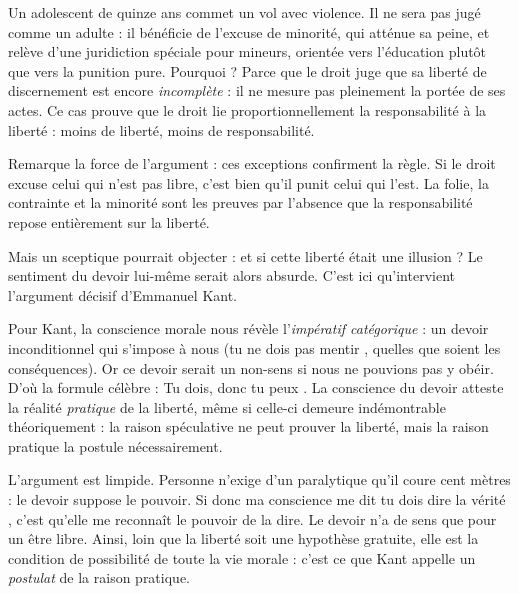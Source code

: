 \documentclass[11pt]{article}
\newcounter{popsec}
\newcounter{popsub}
\newcommand{\courssub}[1]{%
  \stepcounter{popsub}%
  \par\vspace{9pt}\noindent{\popxbold\fontsize{11.5}{13}\selectfont\color{popink}{\color{poporange}\thepopsec.\thepopsub}\hspace{6pt}#1}\par\nopagebreak\vspace{4pt}
}
\begin{document}
\begin{exemplebox}
Un adolescent de quinze ans commet un vol avec violence. Il ne sera pas jugé comme un adulte : il bénéficie de l'excuse de minorité, qui atténue sa peine, et relève d'une juridiction spéciale pour mineurs, orientée vers l'éducation plutôt que vers la punition pure. Pourquoi ? Parce que le droit juge que sa liberté de discernement est encore \emph{incomplète} : il ne mesure pas pleinement la portée de ses actes. Ce cas prouve que le droit lie proportionnellement la responsabilité à la liberté : moins de liberté, moins de responsabilité.
\end{exemplebox}

Remarque la force de l'argument : ces exceptions confirment la règle. Si le droit excuse celui qui n'est pas libre, c'est bien qu'il punit celui qui l'est. La folie, la contrainte et la minorité sont les preuves par l'absence que la responsabilité repose entièrement sur la liberté.

\courssub{Kant : « Tu dois, donc tu peux »}

Mais un sceptique pourrait objecter : et si cette liberté était une illusion ? Le sentiment du devoir lui-même serait alors absurde. C'est ici qu'intervient l'argument décisif d'Emmanuel Kant.

\begin{propriete}
Pour Kant, la conscience morale nous révèle l'\emph{impératif catégorique} : un devoir inconditionnel qui s'impose à nous (\guillemotleft tu ne dois pas mentir \guillemotright, quelles que soient les conséquences). Or ce devoir serait un non-sens si nous ne pouvions pas y obéir. D'où la formule célèbre : \guillemotleft Tu dois, donc tu peux \guillemotright. La conscience du devoir atteste la réalité \emph{pratique} de la liberté, même si celle-ci demeure indémontrable théoriquement : la raison spéculative ne peut prouver la liberté, mais la raison pratique la postule nécessairement.
\end{propriete}

L'argument est limpide. Personne n'exige d'un paralytique qu'il coure cent mètres : le devoir suppose le pouvoir. Si donc ma conscience me dit \guillemotleft tu dois dire la vérité \guillemotright, c'est qu'elle me reconnaît le pouvoir de la dire. Le devoir n'a de sens que pour un être libre. Ainsi, loin que la liberté soit une hypothèse gratuite, elle est la condition de possibilité de toute la vie morale : c'est ce que Kant appelle un \emph{postulat} de la raison pratique.
\end{document}

